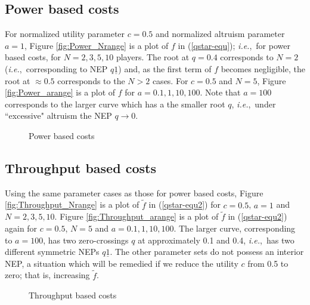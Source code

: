 \documentclass[12pt,onecolumn,draftcls]{IEEEtran}
\newcommand{\ie}{{\em i.e.},~}
\newcommand{\uone}{\underline{1}}
\begin{document}
\subsection{Power based costs}\label{numerical-throughput}
For normalized utility  parameter $c=0.5$ and normalized altruism parameter
$a=1$, Figure \ref{fig:Power_Nrange} is a plot
of $f$ in (\ref{qstar-equ}); \ie for power
based costs, for $N=2,3,5,10$ players. The root at $q=0.4$ corresponds to
$N=2$ (\ie corresponding to NEP $q\uone$)  and, as the first term of $f$
becomes negligible, the root at $\approx 0.5$ corresponds to the $N>2$ cases.
For $c=0.5$ and $N=5$, Figure \ref{fig:Power_arange} is a plot of $f$ for
$a=0.1,1,10,100$.  Note that $a=100$ corresponds to the larger curve which has
a the smaller root $q$, \ie under ``excessive" altruism the NEP
$q\rightarrow 0$.

\begin{figure}[ht]
\centering
{}
\caption{Power based costs}\label{fig:Power}
\end{figure}


\subsection{Throughput based costs}
Using the same parameter cases as those for power based costs, Figure
\ref{fig:Throughput_Nrange} is a plot of $\tilde{f}$ in (\ref{qstar-equ2})
for $c=0.5$, $a=1$ and $N=2,3,5,10$.  Figure \ref{fig:Throughput_arange} is a
plot of $\tilde{f}$ in (\ref{qstar-equ2}) again for $c=0.5$, $N=5$ and
$a=0.1,1,10,100$.  The larger curve, corresponding to $a=100$, has two
zero-crossings $q$ at approximately 0.1 and 0.4, \ie has two different
symmetric NEPs $q\uone$.  The other parameter sets do not possess an
interior NEP, a situation which will be remedied if we reduce the utility
$c$ from 0.5 to zero; that is, increasing $\tilde{f}$.

\begin{figure}[ht]
\centering
{}
\caption{Throughput based costs}\label{fig:Throughput}
\end{figure}
\end{document}
